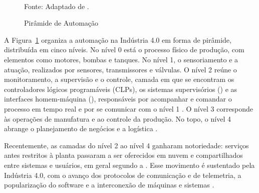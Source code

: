 \begin{figure}[H]
    \centering
    \caption{Pirâmide de Automação}
    \centering
    \vspace{0.3cm}
    \centering
    \vspace{0.2cm} \\
    Fonte: Adaptado de \textcite{COLOMBO2014_STATE_ART_AUTOMATION}.
    \label{fig:piramide_automacao}
\end{figure}

\par A Figura~\ref{fig:piramide_automacao} organiza a automação na Indústria 4.0 em forma de pirâmide, distribuída em cinco níveis. No nível 0 está o processo físico de produção, com elementos como motores, bombas e tanques. No nível 1, o sensoriamento e a atuação, realizados por sensores, transmissores e válvulas. O nível 2 reúne o monitoramento, a supervisão e o controle, camada em que se encontram os controladores lógicos programáveis (CLPs), os sistemas supervisórios () e as interfaces homem-máquina (), responsáveis por acompanhar e comandar o processo em tempo real e por se comunicar com o nível 1 \cite{COLOMBO2014_STATE_ART_AUTOMATION}. O nível 3 corresponde às operações de manufatura e ao controle da produção. No topo, o nível 4 abrange o planejamento de negócios e a logística \cite{BIGHETI2020}.

\par Recentemente, as camadas do nível 2 ao nível 4 ganharam notoriedade: serviços antes restritos à planta passaram a ser oferecidos em nuvem e compartilhados entre sistemas e usuários, em geral segundo a  \cite{COLOMBO2014_STATE_ART_AUTOMATION,AHMED2011_EFFICIENT_WEB_SCADA}. Esse movimento é sustentado pela Indústria 4.0, com o avanço dos protocolos de comunicação e de telemetria, a popularização do software e a interconexão de máquinas e sistemas \cite{LASI_INDUSTRY_40,PISCHING2017,BIGHETI2020}.

